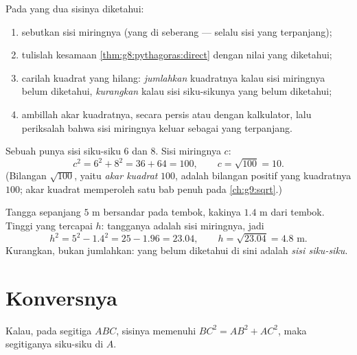 \begin{method}\label{met:g8:pythagoras:compute}
Pada  yang dua sisinya diketahui:
\begin{enumerate}
  \item sebutkan sisi miringnya (yang di seberang 
        --- selalu sisi yang terpanjang);
  \item tulislah kesamaan \cref{thm:g8:pythagoras:direct} dengan nilai
        yang diketahui;
  \item carilah kuadrat yang hilang: \emph{jumlahkan} kuadratnya kalau
        sisi miringnya belum diketahui, \emph{kurangkan} kalau sisi
        siku-sikunya yang belum diketahui;
  \item ambillah akar kuadratnya, secara persis atau dengan
        kalkulator, lalu periksalah bahwa sisi miringnya keluar
        sebagai yang terpanjang.
\end{enumerate}
\end{method}

\begin{example}\label{ex:g8:pythagoras:hypotenuse}
Sebuah  punya sisi siku-siku $6$ dan $8$. Sisi miringnya $c$:
\[
c^2 = 6^2 + 8^2 = 36 + 64 = 100,
\qquad
c = \sqrt{100} = 10 .
\]
(Bilangan $\sqrt{100}$, yaitu \emph{akar kuadrat} $100$, adalah
bilangan positif yang kuadratnya $100$; akar kuadrat memperoleh satu
bab penuh pada \cref{ch:g9:sqrt}.)
\end{example}

\begin{example}\label{ex:g8:pythagoras:leg}
Tangga sepanjang $5$ m bersandar pada tembok, kakinya $1.4$ m dari
tembok. Tinggi yang tercapai $h$: tangganya adalah sisi miringnya, jadi
\[
h^2 = 5^2 - 1.4^2 = 25 - 1.96 = 23.04,
\qquad
h = \sqrt{23.04} = 4.8 \text{ m}.
\]
Kurangkan, bukan jumlahkan: yang belum diketahui di sini adalah \emph{sisi siku-siku}.
\end{example}

\section{Konversnya}

\begin{theorem}\label{thm:g8:pythagoras:converse}
Kalau, pada segitiga $ABC$, sisinya memenuhi $BC^2 = AB^2 + AC^2$,
maka segitiganya siku-siku di $A$.
\end{theorem}
\admitted

